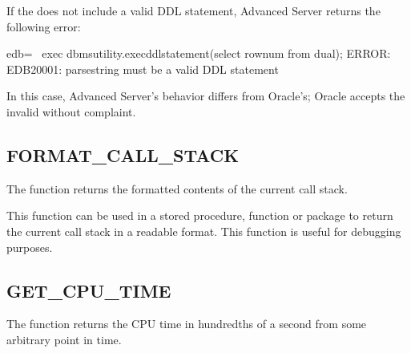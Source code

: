 \documentclass[letterpaper,10pt,english,openany,oneside]{sphinxmanual}
\begin{document}
If the  does not include a valid DDL statement, Advanced Server returns the following error:

%
\begin{sphinxVerbatim}[commandchars=\\\{\}]
edb=\PYGZsh{}  exec dbms\PYGZus{}utility.exec\PYGZus{}ddl\PYGZus{}statement(\PYGZsq{}select rownum from dual\PYGZsq{});
ERROR:  EDB\PYGZhy{}20001: \PYGZsq{}parse\PYGZus{}string\PYGZsq{} must be a valid DDL statement
\end{sphinxVerbatim}

In this case, Advanced Server’s behavior differs from Oracle’s; Oracle
accepts the invalid  without complaint.

\newpage


\subsection{FORMAT\_CALL\_STACK}
\label{\detokenize{dbms_utility:format-call-stack}}
The  function returns the formatted contents of the
current call stack.
\begin{quote}

\begin{DUlineblock}{0em}
\item[] 
\item[] 
\end{DUlineblock}
\end{quote}

This function can be used in a stored procedure, function or package to
return the current call stack in a readable format. This function is
useful for debugging purposes.

\newpage


\subsection{GET\_CPU\_TIME}
\label{\detokenize{dbms_utility:get-cpu-time}}
The  function returns the CPU time in hundredths of a
second from some arbitrary point in time.
\begin{quote}

\end{quote}
\end{document}
